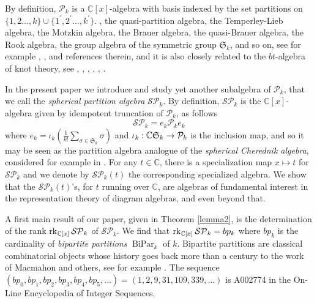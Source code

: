\documentclass[10pt,hidelinks]{article}
\newcommand{\ParAlg}{{\mathcal P }_{k}}
\newcommand{\SpheAlg}{{\mathcal{SP} }_{k}}
\newcommand{\CC}{ \mathbb C }
\newcommand{\Si}{\mathfrak{S}}
\newcommand{\rank }{{ \rm rk }}
\newcommand{\BiPar}{ \operatorname{BiPar}}
\numberwithin{equation}{section}
\begin{document}
\medskip
By definition, $ \ParAlg $ is a $\CC[x]$-algebra with basis
indexed by the 
set partitions on $  \{ 1,2 \ldots, k \} \cup 
\{ 1^{\prime},2^{\prime} \ldots, k^{\prime} \}$.
{\color{black}{There are many important 
subalgebras of the partition algebra, including
the half-integer partition algebra}}, the quasi-partition algebra,
the Temperley-Lieb algebra, the Motzkin algebra, 
the Brauer algebra, the quasi-Brauer algebra, the Rook algebra, the group algebra of
the symmetric group $\Si_k $, and so on,
see for example \cite{CST}, \cite{OrellanaDaugherty}, \cite{Scrimshaw} and references therein,
and it is also closely related to the $bt$-algebra of knot theory, see 
\cite{AicardiJuyumaya}, \cite{ArcisEspinoza}, \cite{Banjo}, \cite{ERH}, \cite{RH1}, \cite{RH2}. 
  
\medskip
In the present paper we introduce and study yet another subalgebra
of $ \ParAlg $, that we call the {\it spherical partition algebra} $ \SpheAlg  $.
By definition, $ \SpheAlg  $ is the $ \CC[x] $-algebra given by idempotent truncation of $ \ParAlg$, as follows
\begin{equation}
 \SpheAlg = e_k \ParAlg e_k 
\end{equation}  
where $  e_k = \iota_k\left ( \frac{1}{k! } \sum_{ \sigma \in \Si_k } \sigma\right)  $
and $ \iota_{\color{black}{k}}: \CC \Si_k \rightarrow  \ParAlg$ is the inclusion map, and so it may be seen as the
partition algebra analogue of the {\it spherical Cherednik algebra}, 
considered for example in \cite{Rouquier}. For any $t \in \CC$, 
there is a specialization map 
$ x \mapsto t $ for $ \SpheAlg $ and we denote by $  \SpheAlg(t) $ the corresponding 
specialized algebra. 
We show that the $  \SpheAlg(t) $'s, for $ t $ running over $ \CC$, are algebras of fundamental
interest in the representation theory of diagram algebras, and even beyond that.  

\medskip
A first main result of our paper, given in Theorem \ref{lemma2}, 
is the determination
of the rank $  \rank_{\CC[x]} \,  \SpheAlg $ of $ \SpheAlg $. We find 
that $  \rank_{\CC[x]} \,  \SpheAlg = bp_k $ where $ bp_k $ is the
cardinality of {\it bipartite partitions} $ \BiPar_k $ of $k$.
Bipartite partitions are classical combinatorial objects whose 
history goes back more than a century to the work of Macmahon and others, see for example \cite{MacMahon}.
The sequence $ (bp_0, bp_1, bp_2, bp_3,  bp_4, bp_5, \ldots ) = (1, 2, 9, 31, 109, 339, \ldots ) $
is A002774 in the On-Line Encyclopedia of Integer Sequences.
\end{document}
